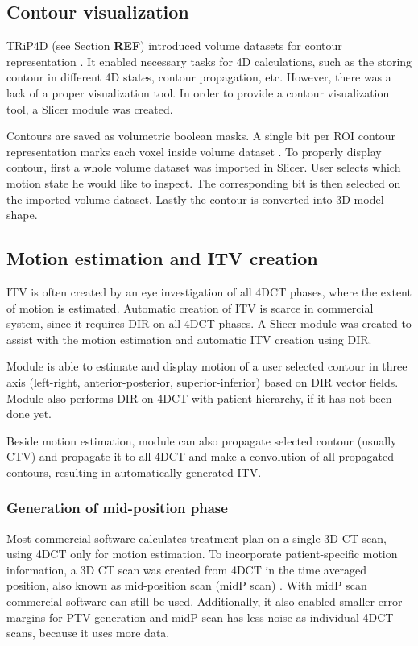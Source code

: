 \documentclass[type=dr, dr=rernat, accentcolor=tud7b,colorbacktitle, bigchapter, openright, twoside, 12pt ]{tudthesis}
\begin{document}
\subsection{Contour visualization}
\label{Contour}

TRiP4D (see Section \textbf{REF}) introduced volume datasets for contour representation \cite{Richter2012}. It enabled necessary tasks for 4D calculations, such as the storing contour in different 4D states, contour propagation, etc. However, there was a lack of a proper visualization tool. In order to provide a contour visualization tool, a Slicer module was created. 

Contours are saved as volumetric boolean masks. A single bit per ROI contour representation marks each voxel inside volume dataset \cite{Richter2012}. To properly display contour, first a whole volume dataset was imported in Slicer. User selects which motion state he would like to inspect. The corresponding bit is then selected on the imported volume dataset. Lastly the contour is converted into 3D model shape. 

\subsection{Motion estimation and ITV creation}

ITV is often created by an eye investigation of all 4DCT phases, where the extent of motion is estimated. Automatic creation of ITV is scarce in commercial system, since it requires DIR on all 4DCT phases. A Slicer module was created to assist with the motion estimation and automatic ITV creation using DIR. 

Module is able to estimate and display motion of a user selected contour in three axis (left-right, anterior-posterior, superior-inferior) based on DIR vector fields. Module also performs DIR on 4DCT with patient hierarchy, if it has not been done yet.

Beside motion estimation, module can also propagate selected contour (usually CTV) and propagate it to all 4DCT and make a convolution of all propagated contours, resulting in automatically generated ITV.

\subsubsection{Generation of mid-position phase}

Most commercial software calculates treatment plan on a single 3D CT scan, using 4DCT only for motion estimation. To incorporate patient-specific motion information, a 3D CT scan was created from 4DCT in the time averaged position, also known as mid-position scan (midP scan) \cite{Wolthaus2008}. With midP scan commercial software can still be used. Additionally, it also enabled smaller error margins for PTV generation and midP scan has less noise as individual 4DCT scans, because it uses more data. 
\end{document}
